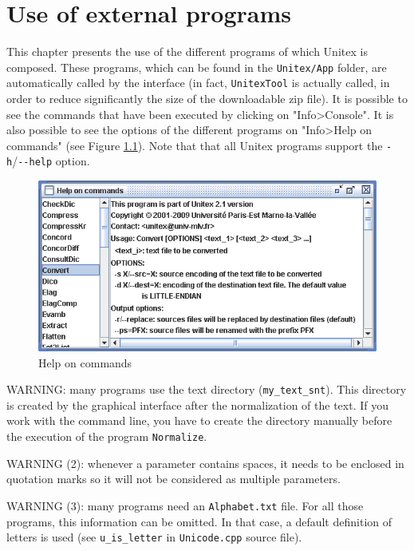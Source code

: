 \chapter{Use of external programs}
\label{chap-external-programs}
This chapter presents the use of the different programs of which Unitex is
composed. These programs, which can be found in the \verb+Unitex/App+ folder, are
automatically called by the interface (in fact, \verb+UnitexTool+ is
actually called, in order to reduce significantly the size of the downloadable
zip file). It is possible to see the commands that have been executed by
clicking on "Info>Console". It is also possible to see the options of the different programs on "Info>Help on commands" (see Figure \ref{fig-help}). Note that that all Unitex
programs support the \verb$-h$/\verb$--help$ option.

\bigskip
\begin{figure}[!h]
\begin{center}
\includegraphics[width=14cm]{resources/img/fig11-1.png}
\caption{Help on commands\label{fig-help}}
\end{center}
\end{figure}

\bigskip
\noindent WARNING: many programs use the text directory
(\verb+my_text_snt+). This directory is created by the graphical interface after
the normalization of the text. If you work with the command line, you have to
create the directory manually before the execution of the program
\verb+Normalize+.

\bigskip
\noindent WARNING (2): whenever a parameter contains spaces, it needs to
be enclosed in quotation marks so it will not be considered as multiple
parameters.

\bigskip
\noindent WARNING (3): many programs need an \verb+Alphabet.txt+ file. For all
those programs, this information can be omitted. In that case, a default
definition of letters is used (see \verb+u_is_letter+ 
in \verb$Unicode.cpp$ source file).

